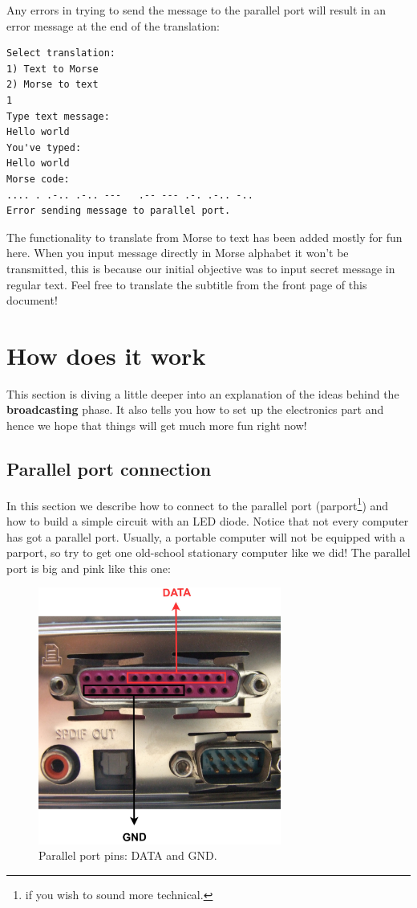 \documentclass[12pt]{report}
\begin{document}
Any errors in trying to send the message to the parallel port will result in an error message at the end of the translation:

\begin{snugshade}
\begin{verbatim}
Select translation:
1) Text to Morse
2) Morse to text
1
Type text message:
Hello world
You've typed: 
Hello world
Morse code: 
.... . .-.. .-.. ---   .-- --- .-. .-.. -.. 
Error sending message to parallel port.
\end{verbatim}
\end{snugshade}

The functionality to translate from Morse to text has been added mostly for fun here. When you input message directly in Morse alphabet it won't be transmitted, this is because our initial objective was to input secret message in regular text. Feel free to translate the subtitle from the front page of this document!

\section{How does it work} \label{sec:howB}

This section is diving a little deeper into an explanation of the ideas behind the \textbf{broadcasting} phase. It also tells you how to set up the electronics part and hence we hope that things will get much more fun right now!

\subsection{Parallel port connection} \label{sec:parportcon}

In this section we describe how to connect to the parallel port (parport\footnote{if you wish to sound more technical.}) and how to build a simple circuit with an LED diode. Notice that not every computer has got a parallel port. Usually, a portable computer will not be equipped with a parport, so try to get one old-school stationary computer like we did! The parallel port is big and pink like this one:

\begin{figure}[H]
\centering\includegraphics[width=8cm]{par_port}
\caption{Parallel port pins: DATA and GND.}				
\label{fig:par_port}
\end{figure}
\end{document}
